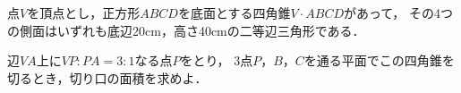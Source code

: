 \documentclass[../../main.tex]{subfiles}
\begin{document}
点$V$を頂点とし，正方形$ABCD$を底面とする四角錐$V\cdot ABCD$があって，
その4つの側面はいずれも底辺20cm，高さ40cmの二等辺三角形である．

辺$VA$上に$VP:PA=3:1$なる点$P$をとり，
3点$P$，$B$，$C$を通る平面でこの四角錐を切るとき，切り口の面積を求めよ．
\end{document}
